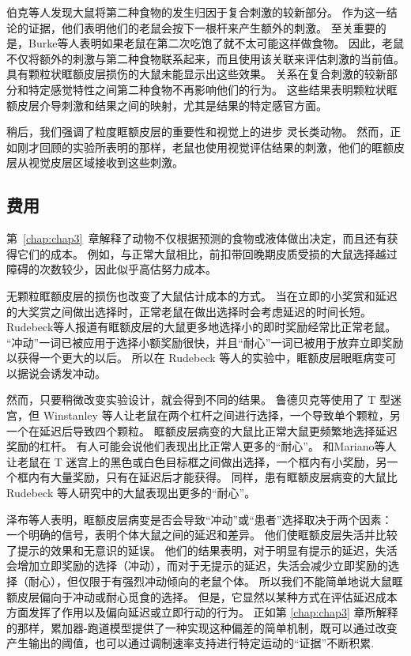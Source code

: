 伯克等人发现大鼠将第二种食物的发生归因于复合刺激的较新部分。
作为这一结论的证据，他们表明他们的老鼠会按下一根杆来产生额外的刺激。
至关重要的是，Burke等人表明如果老鼠在第二次吃饱了就不太可能这样做食物。
因此，老鼠不仅将额外的刺激与第二种食物联系起来，而且使用该关联来评估刺激的当前值。
具有颗粒状眶额皮层损伤的大鼠未能显示出这些效果。
关系在复合刺激的较新部分和特定感觉特性之间第二种食物不再影响他们的行为。
这些结果表明颗粒状眶额皮层介导刺激和结果之间的映射，尤其是结果的特定感官方面。\par


稍后，我们强调了粒度眶额皮层的重要性和视觉上的进步
灵长类动物。
然而，正如刚才回顾的实验所表明的那样，老鼠也使用视觉评估结果的刺激，他们的眶额皮层从视觉皮层区域接收到这些刺激。\par



\subsection{费用}

第~\ref{chap:chap3}~章解释了动物不仅根据预测的食物或液体做出决定，而且还有获得它们的成本。
例如，与正常大鼠相比，前扣带回晚期皮质受损的大鼠选择越过障碍的次数较少，因此似乎高估努力成本。\par


无颗粒眶额皮层的损伤也改变了大鼠估计成本的方式。
当在立即的小奖赏和延迟的大奖赏之间做出选择时，正常老鼠在做出选择时会考虑延迟的时间长短。
Rudebeck等人\cite{rudebeck2006separate}报道有眶额皮层的大鼠更多地选择小的即时奖励经常比正常老鼠。
“冲动”一词已被应用于选择小额奖励很快，并且“耐心”一词已被用于放弃立即奖励以获得一个更大的以后。
所以在 Rudebeck 等人的实验中，眶额皮层眼眶病变可以据说会诱发冲动。\par


然而，只要稍微改变实验设计，就会得到不同的结果。
鲁德贝克等使用了 T 型迷宫，但 Winstanley 等人\cite{winstanley2004contrasting}让老鼠在两个杠杆之间进行选择，一个导致单个颗粒，另一个在延迟后导致四个颗粒。
眶额皮层病变的大鼠比正常大鼠更频繁地选择延迟奖励的杠杆。
有人可能会说他们表现出比正常人更多的“耐心”。
和Mariano等人\cite{mariano2009impulsive}让老鼠在 T 迷宫上的黑色或白色目标框之间做出选择，一个框内有小奖励，另一个框内有大量奖励，只有在延迟后才能获得。
同样，患有眶额皮层病变的大鼠比 Rudebeck 等人研究中的大鼠表现出更多的“耐心”。\par


泽布等人\cite{zeeb2010contributions}表明，眶额皮层病变是否会导致“冲动”或“患者”选择取决于两个因素：
一个明确的信号，表明个体大鼠之间的延迟和差异。
他们使眶额皮层失活并比较了提示的效果和无意识的延误。
他们的结果表明，对于明显有提示的延迟，失活会增加立即奖励的选择（冲动），而对于无提示的延迟，失活会减少立即奖励的选择（耐心），但仅限于有强烈冲动倾向的老鼠个体。
所以我们不能简单地说大鼠眶额皮层偏向于冲动或耐心觅食的选择。
但是，它显然以某种方式在评估延迟成本方面发挥了作用以及偏向延迟或立即行动的行为。
正如第 \ref{chap:chap3} 章所解释的那样，累加器-跑道模型提供了一种实现这种偏差的简单机制，既可以通过改变产生输出的阈值，也可以通过调制速率支持进行特定运动的“证据”不断积累. \par



